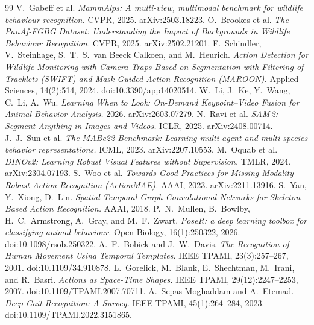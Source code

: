 \documentclass[11pt]{article}
\begin{document}
\begin{thebibliography}{99}
 V.~Gabeff et al. \emph{MammAlps: A multi-view, multimodal benchmark for wildlife behaviour recognition.} CVPR, 2025. arXiv:2503.18223.
 O.~Brookes et al. \emph{The PanAf-FGBG Dataset: Understanding the Impact of Backgrounds in Wildlife Behaviour Recognition.} CVPR, 2025. arXiv:2502.21201.
 F.~Schindler, V.~Steinhage, S.~T.~S.~van Beeck Calkoen, and M.~Heurich. \emph{Action Detection for Wildlife Monitoring with Camera Traps Based on Segmentation with Filtering of Tracklets (SWIFT) and Mask-Guided Action Recognition (MAROON).} Applied Sciences, 14(2):514, 2024. doi:10.3390/app14020514.
 W.~Li, J.~Ke, Y.~Wang, C.~Li, A.~Wu. \emph{Learning When to Look: On-Demand Keypoint--Video Fusion for Animal Behavior Analysis.} 2026. arXiv:2603.07279.
 N.~Ravi et al. \emph{SAM\,2: Segment Anything in Images and Videos.} ICLR, 2025. arXiv:2408.00714.
 J.~J.~Sun et al. \emph{The MABe22 Benchmark: Learning multi-agent and multi-species behavior representations.} ICML, 2023. arXiv:2207.10553.
 M.~Oquab et al. \emph{DINOv2: Learning Robust Visual Features without Supervision.} TMLR, 2024. arXiv:2304.07193.
 S.~Woo et al. \emph{Towards Good Practices for Missing Modality Robust Action Recognition (ActionMAE).} AAAI, 2023. arXiv:2211.13916.
 S.~Yan, Y.~Xiong, D.~Lin. \emph{Spatial Temporal Graph Convolutional Networks for Skeleton-Based Action Recognition.} AAAI, 2018.
 P.~N.~Mullen, B.~Bowlby, H.~C.~Armstrong, A.~Gray, and M.~F.~Zwart. \emph{PoseR: a deep learning toolbox for classifying animal behaviour.} Open Biology, 16(1):250322, 2026. doi:10.1098/rsob.250322.
 A.~F.~Bobick and J.~W.~Davis. \emph{The Recognition of Human Movement Using Temporal Templates.} IEEE TPAMI, 23(3):257--267, 2001. doi:10.1109/34.910878.
 L.~Gorelick, M.~Blank, E.~Shechtman, M.~Irani, and R.~Basri. \emph{Actions as Space-Time Shapes.} IEEE TPAMI, 29(12):2247--2253, 2007. doi:10.1109/TPAMI.2007.70711.
 A.~Sepas-Moghaddam and A.~Etemad. \emph{Deep Gait Recognition: A Survey.} IEEE TPAMI, 45(1):264--284, 2023. doi:10.1109/TPAMI.2022.3151865.
\end{thebibliography}
\end{document}
